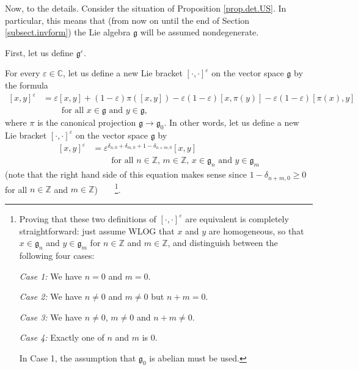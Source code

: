\documentclass
[numbers=enddot,12pt,final,onecolumn,german,notitlepage]{scrartcl}%
\theoremstyle{definition}
\begin{document}
Now, to the details. Consider the situation of Proposition \ref{prop.det.US}.
In particular, this means that (from now on until the end of Section
\ref{subsect.invform}) the Lie algebra $\mathfrak{g}$ will be assumed nondegenerate.

First, let us define $\mathfrak{g}^{\varepsilon}$.

For every $\varepsilon\in\mathbb{C}$, let us define a new Lie bracket $\left[
\cdot,\cdot\right]  ^{\varepsilon}$ on the vector space $\mathfrak{g}$ by the
formula%
\begin{align}
\left[  x,y\right]  ^{\varepsilon}  &  =\varepsilon\left[  x,y\right]
+\left(  1-\varepsilon\right)  \pi\left(  \left[  x,y\right]  \right)
-\varepsilon\left(  1-\varepsilon\right)  \left[  x,\pi\left(  y\right)
\right]  -\varepsilon\left(  1-\varepsilon\right)  \left[  \pi\left(
x\right)  ,y\right] \label{pf.invformnondeg.g^epsi.1}\\
&  \ \ \ \ \ \ \ \ \ \ \text{for all }x\in\mathfrak{g}\text{ and }%
y\in\mathfrak{g},\nonumber
\end{align}
where $\pi$ is the canonical projection $\mathfrak{g}\rightarrow
\mathfrak{g}_{0}$. In other words, let us define a new Lie bracket $\left[
\cdot,\cdot\right]  ^{\varepsilon}$ on the vector space $\mathfrak{g}$ by%
\begin{align}
\left[  x,y\right]  ^{\varepsilon}  &  =\varepsilon^{\delta_{n,0}+\delta
_{m,0}+1-\delta_{n+m,0}}\left[  x,y\right]  \label{pf.invformnondeg.g^epsi.2}%
\\
&  \ \ \ \ \ \ \ \ \ \ \text{for all }n\in\mathbb{Z}\text{, }m\in
\mathbb{Z}\text{, }x\in\mathfrak{g}_{n}\text{ and }y\in\mathfrak{g}%
_{m}\nonumber
\end{align}
(note that the right hand side of this equation makes sense since
$1-\delta_{n+m,0}\geq0$ for all $n\in\mathbb{Z}$ and $m\in\mathbb{Z}%
$)\ \ \ \ \footnote{Proving that these two definitions of $\left[  \cdot
,\cdot\right]  ^{\varepsilon}$ are equivalent is completely straightforward:
just assume WLOG that $x$ and $y$ are homogeneous, so that $x\in
\mathfrak{g}_{n}$ and $y\in\mathfrak{g}_{m}$ for $n\in\mathbb{Z}$ and
$m\in\mathbb{Z}$, and distinguish between the following four cases:
\par
\textit{Case 1:} We have $n=0$ and $m=0$.
\par
\textit{Case 2:} We have $n\neq0$ and $m\neq0$ but $n+m=0$.
\par
\textit{Case 3:} We have $n\neq0$, $m\neq0$ and $n+m\neq0$.
\par
\textit{Case 4:} Exactly one of $n$ and $m$ is $0$.
\par
In Case 1, the assumption that $\mathfrak{g}_{0}$ is abelian must be used.}.
\end{document}
